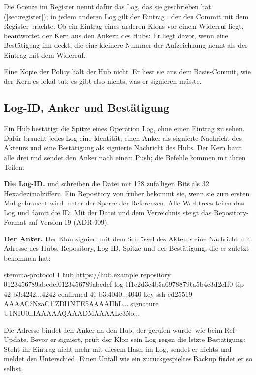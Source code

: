 Die Grenze im Register nennt dafür das Log, das sie geschrieben hat
([sec:register]); in jedem anderen Log gilt der Eintrag , der den
Commit mit dem Register brachte.
Ob ein Eintrag eines anderen Klons vor einem Widerruf liegt, beantwortet der Kern aus den Ankern
des Hubs: Er liegt davor, wenn eine Bestätigung ihn deckt, die eine kleinere Nummer der
Aufzeichnung nennt als der Eintrag mit dem Widerruf.

Eine Kopie der Policy hält der Hub nicht.
Er liest sie aus dem Basis-Commit, wie der Kern es lokal tut; es gibt also nichts, was er
signieren müsste.

\subsection[sec:anchor-confirm]{Log-ID, Anker und Bestätigung}

Ein Hub bestätigt die Spitze eines Operation Log, ohne einen Eintrag zu sehen.
Dafür braucht jedes Log eine Identität, einen Anker als signierte Nachricht des Akteurs und eine
Bestätigung als signierte Nachricht des Hubs.
Der Kern baut alle drei und sendet den Anker nach einem Push; die Befehle kommen mit ihren
Teilen.

{\bf Die Log-ID.}
 und  schreiben die Datei  mit 128 zufälligen Bits als
32 Hexadezimalziffern.
Ein Repository von früher bekommt sie, wenn sie zum ersten Mal gebraucht wird, unter der Sperre
der Referenzen.
Alle Worktrees teilen das Log und damit die ID.
Mit der Datei und dem Verzeichnis  steigt das Repository-Format auf Version 19
(ADR-009).

{\bf Der Anker.}
Der Klon signiert mit dem Schlüssel des Akteurs eine Nachricht mit Adresse des Hubs, Repository,
Log-ID, Spitze und der Bestätigung, die er zuletzt bekommen hat:

\starttyping
stemma-protocol 1
hub https://hub.example
repository 0123456789abcdef0123456789abcdef
log 0f1e2d3c4b5a69788796a5b4c3d2e1f0
tip 42 b3:4242...4242
confirmed 40 b3:4040...4040
key ssh-ed25519 AAAAC3NzaC1lZDI1NTE5AAAAIIhL...
signature U1NIU0lHAAAAAQAAADMAAAALc3No...
\stoptyping

Die Adresse bindet den Anker an den Hub, der gerufen wurde, wie beim Ref-Update.
Bevor er signiert, prüft der Klon sein Log gegen die letzte Bestätigung: Steht ihr Eintrag nicht
mehr mit diesem Hash im Log, sendet er nichts und meldet den Unterschied.
Einen Unfall wie ein zurückgespieltes Backup findet er so selbst.

